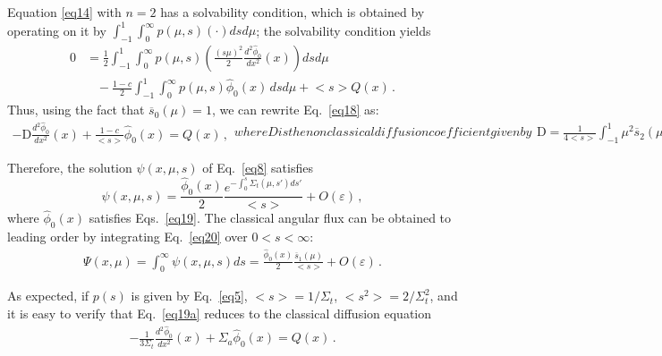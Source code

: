 \documentclass{anstrans}
\newcommand{\bl}{\big<}
\newcommand{\bg}{\big>}
\begin{document}
 Equation \eqref{eq14} with $n=2$ has a solvability condition, which is obtained by operating on it by $\int_{-1}^1\int_0^{\infty} p(\mu,s) ( \cdot ) ds d\mu$; the solvability condition yields
   \begin{align}\label{eq18}
      0 &= \frac{1}{2}\int_{-1}^1\int_0^{\infty}p(\mu,s)\left(\frac{(s\mu)^2}{2} \frac{d^2\hat\phi_0}{dx^2}(x)\right)ds d\mu\\
          & \,\,\,\,\, - \frac{1-c}{2} \int_{-1}^1\int_0^{\infty} p(\mu,s) \hat\phi_0( x) \, ds d\mu + \bl s\bg Q( x)\,.\nonumber 
   \end{align}
Thus, using the fact that $\overline s_0(\mu)=1$,
we can rewrite Eq.\ \eqref{eq18} as:
\begin{subequations}\label{eq19}
\begin{align}
      -\text{D}\frac{d^2\hat\phi_0}{dx^2}(x) + \frac{1-c}{\bl s\bg } \hat\phi_0(x) = Q(x)\,,\label{eq19a}
      \end{align}
      where D is the nonclassical diffusion coefficient given by
      \begin{align}
      \text{D} = \frac{1}{4\bl s\bg}\int_{-1}^1\mu^2 \overline s_2(\mu)d\mu \, .
   \end{align}
   \end{subequations}

Therefore, the solution $\psi(x, \mu, s)$ of Eq.\ \eqref{eq8} satisfies
   \begin{equation}\label{eq20}
      \psi(x, \mu, s) = \frac{\hat\phi_0(x)}{2} \frac{e^{- \int_0^s \Sigma_t(\mu, s') ds'}} 
         {\bl s\bg} + O(\varepsilon) \,,
   \end{equation} 
where $\hat\phi_0(x)$ satisfies Eqs.\ \eqref{eq19}. The classical angular flux can be obtained to leading order by integrating Eq.\ \eqref{eq20} over $0 < s < \infty$:
   \begin{align}
   \Psi(x, \mu) = \int_0^{\infty}\psi(x,\mu,s)ds = \frac{\hat\phi_0(x)}{2}\frac{\overline s_1(\mu)}{\bl s\bg} + O(\varepsilon) \,.
   \label{5.26}
   \end{align}

As expected, if $p(s)$ is given by Eq.\ \eqref{eq5}, $\bl s\bg = 1/\Sigma_t$, $\bl s^2\bg = 2/\Sigma_t^2$, and it is easy to verify that Eq.\ \eqref{eq19a} reduces to the classical diffusion equation
\begin{align}
 -\frac{1}{3\Sigma_t}\frac{d^2\hat\phi_0}{dx^2}(x) + \Sigma_a \hat\phi_0(x) = Q(x)\,.
\end{align}


\end{document}
